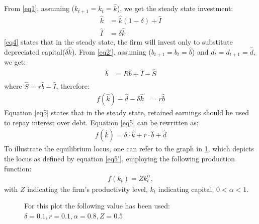 \documentclass[12pt]{report}
\begin{document}
From \ref{eq1}, assuming (\(k_{t+1}=k_{t}=\widehat{k}\)), we get the steady state investment:%
\begin{align}
    \widehat{k}&=\widehat{k}\left(1-\delta\right) + \widehat{I} \nonumber\\
    \widehat{I}&=\delta \widehat{k}  \label{eq4}
\end{align}
\ref{eq4} states that in the steady state, the firm will invest only to substitute depreciated capital(\(\delta
\widehat{k}\)). From \ref{eq2'},  assuming (\(b_{t+1}=b_{t} = \widehat{b}\)) and \(d_t=d_{t+1}=\hat{d} \), we get:
\begin{align}
    \widehat{b} &= R \widehat{b} + \widehat{I} - \widehat{S} \nonumber \\
\end{align}
where \(\widehat{S} = r \widehat{b} - \widehat{I}  \), therefore:
\begin{align}
    f\left(\widehat{k}\right) - \widehat{d} - \delta \widehat{k} &= r \widehat{b} \label{eq5}
\end{align}
Equation \ref{eq5} states that in the steady state, retained earnings should be used to repay
interest over debt.
Equation \ref{eq5} can be rewritten as:
\begin{align}
    f(\widehat{k}) = \delta \cdot \widehat{k} + r \cdot \widehat{b} + \widehat{d} \label{eq5'}
\end{align}
To illustrate the equilibrium locus, one can refer to the graph in \ref{fig:steadystate3d},
which depicts the locus as defined by equation \ref{eq5'}, employing the following production function:
\begin{align}
    f(k_{t}) = Z  k_{t}^\alpha, \label{eq6} 
\end{align}
 with \(Z\) indicating the firm's productivity level, \(k_t\) indicating capital, \(0<\alpha<1\).  

\begin{figure}
    \centering
    
    \caption{For this plot the following value has been used: \(\delta =0.1, r=0.1, \alpha=0.8, Z=0.5\)}
    \label{fig:steadystate3d}
\end{figure}
\end{document}
